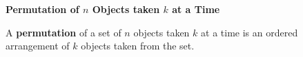 {\bf Permutation of $n$ Objects taken $k$ at a Time}
\vskip 6pt

A {\bf permutation} of a set of $n$ objects taken $k$ at a time is an ordered arrangement of $k$ objects taken from the set.

\vfill\eject
